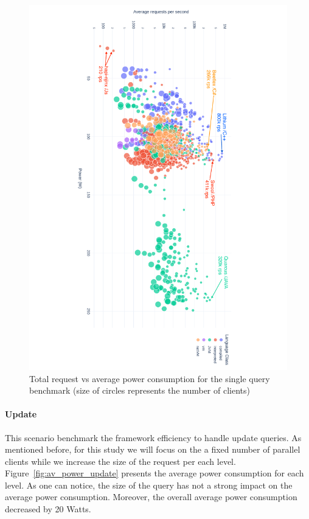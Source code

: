 \begin{figure}[hbt]
    \includegraphics[height=\textwidth,width=\textheight,keepaspectratio,angle=90]{imgs/power_requests_query_log}
    \caption{Total request vs average power consumption for the single query benchmark (size of circles represents the number of clients) }
    \label{fig:power_requests_query}
\end{figure}

\paragraph{Update}
This scenario benchmark the framework efficiency to handle update queries.
As mentioned before, for this study we will focus on the a fixed number of parallel clients while we increase the size of the request per each level.
Figure~\ref{fig:av_power_update} presents the average power consumption for each level.
As one can notice, the size of the query has not a strong impact on the average power consumption.
Moreover, the overall average power consumption decreased by 20 Watts.

